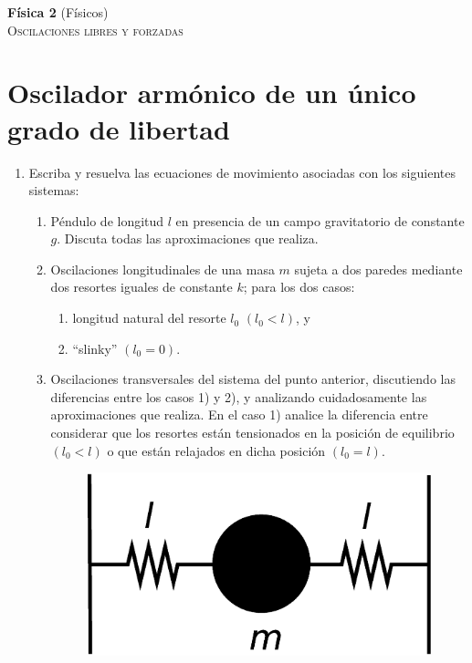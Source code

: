 \documentclass[11pt,spanish,a4paper]{article}
\begin{document}
\begin{center}
\textbf{Física 2} (Físicos) \hfill {}\\
	\textsc{\LARGE Oscilaciones libres y forzadas}
\end{center}


\section*{Oscilador armónico de un único grado de libertad}


\begin{enumerate}


\item Escriba y resuelva las ecuaciones de movimiento asociadas con los
siguientes sistemas: 
\begin{enumerate}
\item Péndulo de longitud $l$ en presencia de un campo gravitatorio de
constante $g$. Discuta todas las aproximaciones que realiza.
\item Oscilaciones longitudinales de una masa $m$ sujeta a dos paredes
mediante dos resortes iguales de constante $k$; para los dos casos: 

\begin{enumerate}
\item longitud natural del resorte $l_{0}$ $(l_{0}<l)$, y 
\item ``slinky'' $(l_{0}=0)$. 
\end{enumerate}
\item Oscilaciones transversales del sistema del punto anterior, discutiendo
las diferencias entre los casos 1) y 2), y analizando cuidadosamente
las aproximaciones que realiza. En el caso 1) analice la diferencia
entre considerar que los resortes están tensionados en la posición
de equilibrio $(l_{0}<l)$ o que están relajados en dicha posición
$(l_{0}=l)$.
\begin{figure}[H]
\centering{}\includegraphics[clip,scale=0.25]{ej1-1}
\end{figure}


\end{enumerate}
\end{enumerate}
\end{document}
